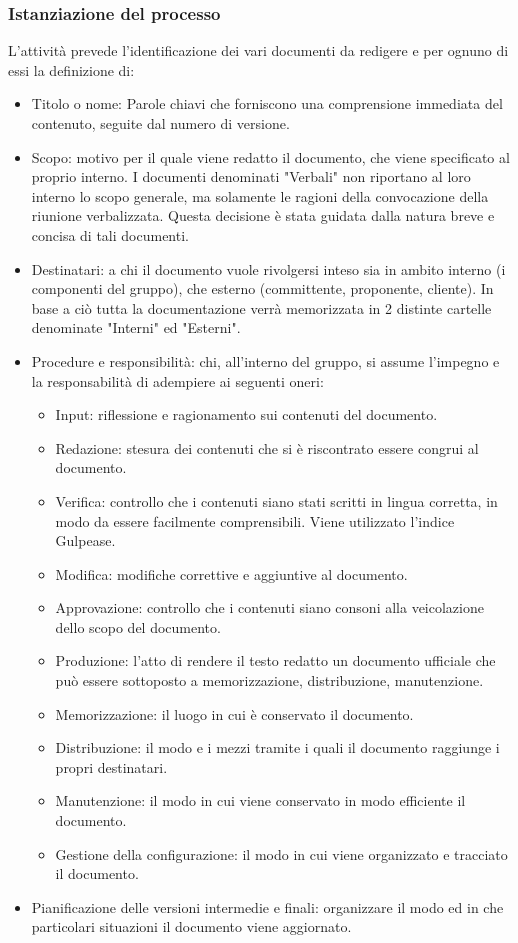 \subsubsection{Istanziazione del processo}
L'attività prevede l'identificazione dei vari documenti da redigere e per ognuno di essi la definizione di:
\begin{itemize}
    \item Titolo o nome: Parole chiavi che forniscono una comprensione immediata del contenuto, seguite dal numero di versione.
    \item Scopo: motivo per il quale viene redatto il documento, che viene specificato al proprio interno. I documenti denominati "Verbali" non riportano al loro interno lo scopo generale, ma solamente le ragioni della convocazione della riunione verbalizzata. Questa decisione è stata guidata dalla natura breve e concisa di tali documenti.
    \item Destinatari: a chi il documento vuole rivolgersi inteso sia in ambito interno (i componenti del gruppo), che esterno (committente, proponente, cliente). In base a ciò tutta la documentazione verrà memorizzata in 2 distinte cartelle denominate "Interni" ed "Esterni".
    \item Procedure e responsibilità: chi, all'interno del gruppo, si assume l'impegno e la responsabilità di adempiere ai seguenti oneri:
    \begin{itemize}
        \item Input: riflessione e ragionamento sui contenuti del documento.
        \item Redazione: stesura dei contenuti che si è riscontrato essere congrui al documento.
        \item Verifica: controllo che i contenuti siano stati scritti in lingua corretta, in modo da essere facilmente comprensibili. Viene utilizzato l'indice Gulpease.
        \item Modifica: modifiche correttive e aggiuntive al documento.
        \item Approvazione: controllo che i contenuti siano consoni alla veicolazione dello scopo del documento.
        \item Produzione: l'atto di rendere il testo redatto un documento ufficiale che può essere sottoposto a memorizzazione, distribuzione, manutenzione.
        \item Memorizzazione: il luogo in cui è conservato il documento.
        \item Distribuzione: il modo e i mezzi tramite i quali il documento raggiunge i propri destinatari.
        \item Manutenzione: il modo in cui viene conservato in modo efficiente il documento. 
        \item Gestione della configurazione: il modo in cui viene organizzato e tracciato il documento.
    \end{itemize}
    \item Pianificazione delle versioni intermedie e finali: organizzare il modo ed in che particolari situazioni il documento viene aggiornato.
\end{itemize}

